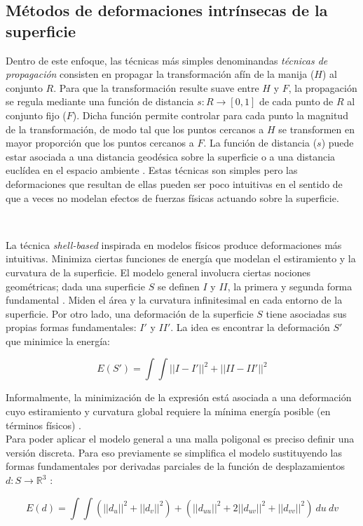 \documentclass{article}
\begin{document}
\subsection{Métodos de deformaciones intrínsecas de la superficie}
Dentro de este enfoque, las técnicas más simples denominandas \emph{técnicas 
de propagación} consisten en propagar la transformación afín de la manija 
($H$) al conjunto $R$. Para que la transformación resulte suave entre $H$ 
y $F$, la propagación se regula mediante una función de distancia 
$s: R \rightarrow [0,1]$ de cada punto de $R$ al conjunto fijo ($F$). Dicha 
función permite controlar para cada punto la magnitud de la transformación, 
de modo tal que los puntos cercanos a $H$ se transformen en mayor proporción 
que los puntos cercanos a $F$. La función de distancia ($s$) puede estar 
asociada a una distancia geodésica sobre la superficie 
\cite{BK:2003} o a una distancia euclídea en el espacio ambiente \cite{P:2003}. 
Estas técnicas son simples pero las deformaciones que resultan de ellas 
pueden ser poco intuitivas en el sentido de que a veces no modelan efectos 
de fuerzas físicas actuando sobre la superficie.

\

La técnica \emph{shell-based} inspirada en modelos físicos produce deformaciones 
más intuitivas. Minimiza ciertas funciones de energía que modelan el estiramiento 
y la curvatura de la superficie. El modelo general involucra ciertas nociones 
geométricas; dada una superficie $S$ se definen $I$ y $II$, la primera y 
segunda forma fundamental \cite{doCarmo:1976}. Miden el área y la curvatura 
infinitesimal en cada entorno de la superficie. Por otro lado, una deformación 
de la superficie $S$ tiene asociadas sus propias formas fundamentales: $I'$ 
y $II'$. La idea es encontrar la deformación $S'$ que minimice la energía:

$$E(S') = \int \int ||I - I'||^2 + ||II-II'||^2$$

Informalmente, la minimización de la expresión está asociada a una deformación 
cuyo estiramiento y curvatura global requiere la mínima energía posible 
(en términos físicos) \cite{T:1987}. \\
Para poder aplicar el modelo general a una malla poligonal es preciso definir 
una versión discreta. Para eso previamente se simplifica el modelo sustituyendo 
las formas fundamentales por derivadas parciales de la función de desplazamientos 
$d: S \rightarrow \mathbb{R}^3$ \cite{WW:1992}:

$$E(d) = \int \int (||d_u||^2 + ||d_v||^2) + 
(||d_{uu}||^2 + 2 ||d_{uv}||^2 + ||d_{vv}||^2) \ du \ dv$$
\end{document}
